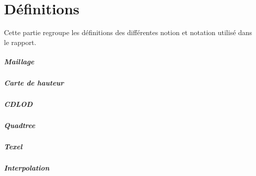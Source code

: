  \chapter*{Définitions}
    Cette partie regroupe les définitions des différentes notion et notation utilisé dans le rapport.
    
    
    \paragraph{Maillage}
    \paragraph{Carte de hauteur}
    \paragraph{CDLOD}
    \paragraph{Quadtree}
    \paragraph{Texel}
    \paragraph{Interpolation}